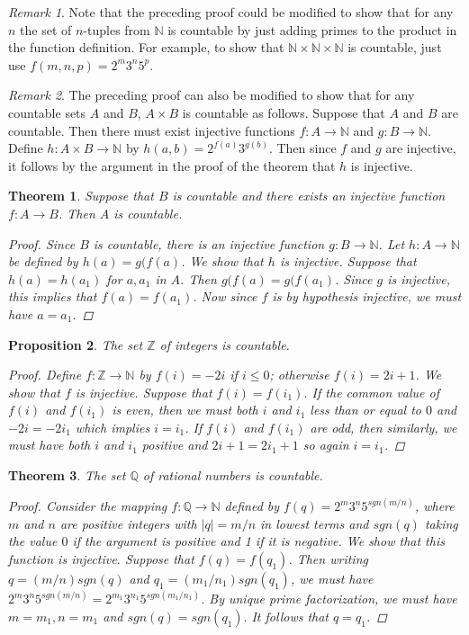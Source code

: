 \documentclass[11pt,a4paper]{report}
\theoremstyle{plain}
\newtheorem{thm}{Theorem}[section]
\newtheorem{prop}[thm]{Proposition}
\theoremstyle{definition}
\theoremstyle{remark}
\newtheorem*{rem}{Remark}
\begin{document}
\begin{rem}
Note that the preceding proof could be modified to show that for any $n$ the set of $n$-tuples from $\mathbb{N}$ is countable by just adding primes to the product in the function definition.  For example, to show that $\mathbb{N} \times \mathbb{N} \times \mathbb{N}$ is countable, just use \mbox{$f(m, n, p) = 2^{m} 3^{n} 5^p$}.
\end{rem}
\begin{rem}
The preceding proof can also be modified to show that for any countable sets $A$ and $B$, $A \times B$ is countable as follows.  Suppose that $A$ and $B$ are countable.  Then there must exist injective functions $f \colon A \to \mathbb{N}$ and $g \colon B \to \mathbb{N}$.  Define $h \colon A \times B \to \mathbb{N}$ by $h(a,b) = 2^{f(a)} 3^{g(b)}$.  Then since $f$ and $g$ are injective, it follows by the argument in the proof of the theorem that $h$ is injective.
\end{rem}
\begin{thm}
Suppose that $B$ is countable and there exists an injective function $f \colon A \to B$.  Then $A$ is countable.
\begin{proof}
Since $B$ is countable, there is an injective function $g \colon B \to \mathbb{N}$.  Let $h \colon A \to \mathbb{N}$ be defined by $h(a) = g(f(a)$.  We show that $h$ is injective. Suppose that $h(a) = h(a_1)$ for $a, a_1$ in $A$.  Then $g(f(a) = g(f(a_1)$.  Since $g$ is injective, this implies that $f(a) = f(a_1)$.  Now since $f$ is by hypothesis injective, we must have $a = a_1$.
\end{proof}
\end{thm}
\begin{prop}
The set $\mathbb{Z}$ of integers is countable.
\begin{proof}
Define $f \colon \mathbb{Z} \to \mathbb{N}$ by $f(i) = -2i$ if $i \leq 0$; otherwise $f(i) = 2i + 1$. We show that $f$ is injective.  Suppose that $f(i) = f(i_1)$.  If the common value of $f(i)$ and $f(i_1)$ is even, then we must both $i$ and $i_1$ less than or equal to $0$ and $-2i = -2i_1$ which implies $i = i_1$.  If $f(i)$ and $f(i_1)$ are odd, then similarly, we must have both $i$ and $i_1$ positive and $2i +1 = 2i_1 + 1$ so again $i = i_1$.
\end{proof}
\end{prop}
\begin{thm}
The set $\mathbb{Q}$ of rational numbers is countable.
\begin{proof}
Consider the mapping $f \colon \mathbb{Q} \to \mathbb{N}$ defined by $f(q) = 2^m3^n5^{sgn(m/n)}$, where $m$ and $n$ are positive integers with $|q| = m/n$ in lowest terms and $sgn(q)$ taking the value $0$ if the argument is positive and 1 if it is negative.  We show that this function is injective.  Suppose that $f(q) = f(q_1)$.  Then writing $q = (m/n)sgn(q)$ and $q_1 = (m_1/n_1)sgn(q_1)$, we must have  $2^m3^n5^{sgn(m/n)} = 2^{m_1}3^{n_1}5^{sgn(m_1/n_1)}$. By unique prime factorization, we must have $m = m_1, n=m_1$ and $sgn(q) = sgn(q_1).$  It follows that $q = q_1$.
\end{proof}
\end{thm}
\end{document}
